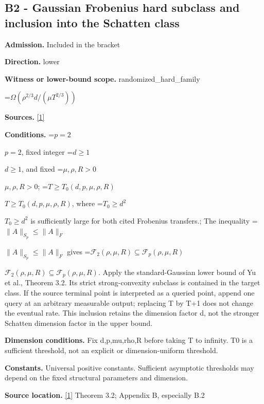 \documentclass[10pt,a4paper]{article}
\newcommand{\AtlasMath}[1]{\par\begingroup\centering\setbox0=\hbox{$\displaystyle #1$}\ifdim\wd0>1.4\linewidth\typeout{ATLAS WIDE FORMULA: \the\wd0}\fi\ifdim\wd0>\linewidth\resizebox{\linewidth}{!}{\box0}\else\box0\fi\par\endgroup}
\newcommand{\AtlasInlineMath}[1]{\begingroup\setbox0=\hbox{$#1$}\ifdim\wd0>.4\linewidth\endgroup\AtlasMath{#1}\else\endgroup$#1$\fi}
\begin{document}
\subsection{B2 - Gaussian Frobenius hard subclass and inclusion into the Schatten class}


\textbf{Admission.} Included in the bracket



\textbf{Direction.} lower



\textbf{Witness or lower-bound scope.} randomized\_hard\_family



\AtlasMath{\Omega(\rho^{2/3}d/(\mu T^{2/3}))}


\textbf{Sources.} \href{https://papers.nips.cc/paper_files/paper/2024/file/b444ad72520a5f5c467343be88e352ed-Paper-Conference.pdf}{[1]}



\textbf{Conditions.} \AtlasInlineMath{p=2}, fixed integer \AtlasInlineMath{d\ge1}, and fixed \AtlasInlineMath{\mu,\rho,R>0}; \AtlasInlineMath{T\ge T_0(d,p,\mu,\rho,R)}, where \AtlasInlineMath{T_0\ge d^2} is sufficiently large for both cited Frobenius transfers.; The inequality \AtlasInlineMath{\|A\|_{S_p}\le\|A\|_F} gives \AtlasInlineMath{\mathcal F_2(\rho,\mu,R)\subseteq\mathcal F_p(\rho,\mu,R)}. Apply the standard-Gaussian lower bound of Yu et al., Theorem 3.2. Its strict strong-convexity subclass is contained in the target class. If the source terminal point is interpreted as a queried point, append one query at an arbitrary measurable output; replacing T by T+1 does not change the eventual rate. This inclusion retains the dimension factor d, not the stronger Schatten dimension factor in the upper bound.



\textbf{Dimension conditions.} Fix d,p,mu,rho,R before taking T to infinity. T0 is a sufficient threshold, not an explicit or dimension-uniform threshold.



\textbf{Constants.} Universal positive constants. Sufficient asymptotic thresholds may depend on the fixed structural parameters and dimension.



\textbf{Source location.} \href{https://papers.nips.cc/paper_files/paper/2024/file/b444ad72520a5f5c467343be88e352ed-Paper-Conference.pdf}{[1]} Theorem 3.2; Appendix B, especially B.2
\end{document}

